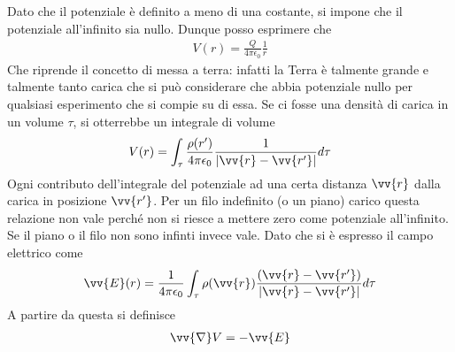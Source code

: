 \documentclass[a4paper, oneside]{article}
\begin{document}
Dato che il potenziale è definito a meno di una costante, si impone che 
il potenziale all'infinito sia nullo. Dunque posso esprimere che
\begin{gather*}
    V(r) = \frac{Q}{4\pi\epsilon_0} \frac{1}{r}
\end{gather*}
Che riprende il concetto di messa a terra: infatti la Terra è talmente grande e talmente 
tanto carica che si può considerare che abbia potenziale nullo per qualsiasi esperimento 
che si compie su di essa. Se ci fosse una densità di carica in un volume $\tau$, si otterrebbe
un integrale di volume
\begin{gather*}
    V(r) = \int_{\tau} \frac{\rho(r')}{4\pi\epsilon_0} \frac{1}{\left| \vv{r} - \vv{r'}   \right| } d\tau  
\end{gather*}
Ogni contributo dell'integrale del potenziale ad una certa distanza $\vv{r}$ dalla carica in posizione $\vv{r'}$. Per un filo 
indefinito (o un piano) carico questa relazione non vale perché non si riesce a mettere
zero come potenziale all'infinito. Se il piano o il filo non sono infinti
invece vale. Dato che si è espresso il campo elettrico come
\begin{gather*}
    \vv{E}(r) = \frac{1}{4\pi\epsilon_0} \int_{\tau}^{}  \rho(\vv{r} ) \frac{(\vv{r} - \vv{r'} )}{\left| \vv{r} - \vv{r'}   \right| }d\tau  
\end{gather*}  
A partire da questa si definisce
\begin{gather*}
    \vv{\nabla}V = -\vv{E}  
\end{gather*}
\end{document}
